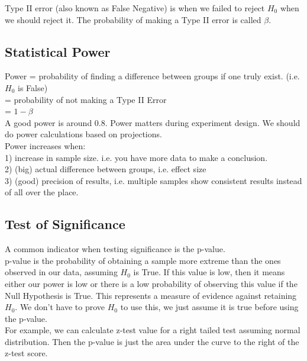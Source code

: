 Type II error (also known as False Negative) is when we failed to reject $H_0$ when we should reject it. The probability of making a Type II error is called $\beta$. 

\subsection{Statistical Power}

Power = probability of finding a difference between groups if one truly exist. (i.e. $H_0$ is False)\\
= probability of not making a Type II Error \\
= $1 - \beta$\\

A good power is around 0.8. Power matters during experiment design. We should do power calculations based on projections.\\

Power increases when:\\
1) increase in sample size. i.e. you have more data to make a conclusion.\\
2) (big) actual difference between groups, i.e. effect size\\
3) (good) precision of results, i.e. multiple samples show consistent results instead of all over the place.\\

\subsection{Test of Significance}

A common indicator when testing significance is the p-value. \\

p-value is the probability of obtaining a sample more extreme than the ones observed in our data, assuming $H_0$ is True. If this value is low, then it means either our power is low or there is a low probability of observing this value if the Null Hypothesis is True. This represents a measure of evidence against retaining $H_0$. We don't have to prove $H_0$ to use this, we just assume it is true before using the p-value.\\

For example, we can calculate z-test value for a right tailed test assuming normal distribution. Then the p-value is just the area under the curve to the right of the z-test score.   \\

